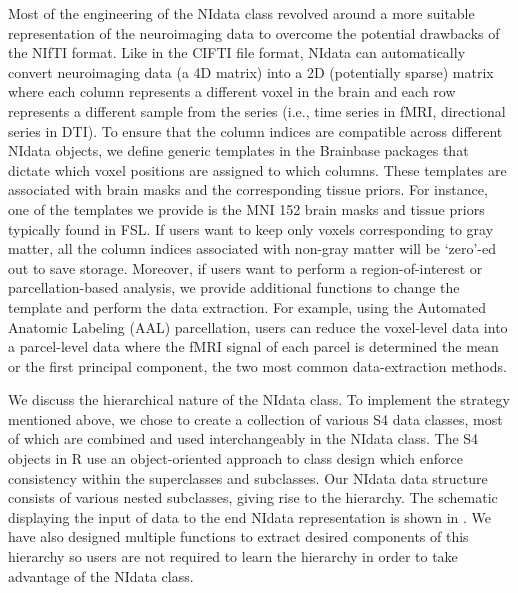 \documentclass{nature}
\begin{document}
Most of the engineering of the NIdata class revolved around a more suitable
representation of the neuroimaging data to overcome the potential
drawbacks of the NIfTI format. Like in the CIFTI file
format\cite{Glasser2013The},
NIdata can automatically convert neuroimaging data (a 4D matrix)
into a 2D (potentially sparse) matrix where each
column represents a different voxel
in the brain and each row represents
a different sample from the series (i.e., time series in fMRI, directional
series in DTI). To ensure that the column indices are
compatible across different NIdata objects, we define generic templates in the
Brainbase packages that dictate which voxel positions are assigned to which
columns.
These templates are associated with brain masks and the corresponding tissue
priors. 
For instance, one of the templates we provide is the MNI 152 brain masks and
tissue priors typically found in FSL.
If users want to keep only voxels corresponding to gray matter, all the column
indices associated with non-gray matter will be `zero'-ed out to save storage.
Moreover, if users want to perform a
region-of-interest or parcellation-based analysis, we provide
additional functions to change the template and perform the data extraction.
For example, using the Automated Anatomic Labeling (AAL) parcellation\cite{tzourio2002automated},
users can reduce the voxel-level data into a parcel-level data where the fMRI
signal of each parcel is determined the mean or the first principal component, the two most
common data-extraction methods.

We discuss the hierarchical nature of the NIdata class. To implement the strategy mentioned
above, we chose to create a collection of various S4 data classes, most of which are combined and used
interchangeably in the NIdata class. The S4 objects in R use an object-oriented approach to class design
which enforce consistency within the superclasses and subclasses. Our NIdata data structure consists of
various nested subclasses, giving rise to the hierarchy. 
The
schematic displaying the input of data to the end NIdata representation
is shown in . We have also designed multiple functions to extract
desired components of this hierarchy so users are not required to learn the hierarchy in order to
take advantage of the NIdata class.
\end{document}
